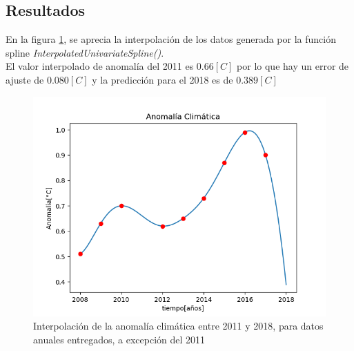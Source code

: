 \documentclass[10pt,a4paper]{article}
\begin{document}
\subsection{Resultados}
En la figura \ref{anomali}, se aprecia la interpolación de los datos generada por la función spline \textit{InterpolatedUnivariateSpline()}.\\
El valor interpolado de anomalía del 2011 es $0.66[C]$ por lo que hay un error de ajuste de $0.080[C]$ y la predicción para el 2018 es de $0.389[C]$

\begin{figure}[h]
\centering
\includegraphics[scale=0.5]{interpolacion_anomalia.png}
\caption{Interpolación de la anomalía climática entre 2011 y 2018, para datos anuales entregados, a excepción del 2011}
\label{anomali}
\end{figure}
\end{document}
